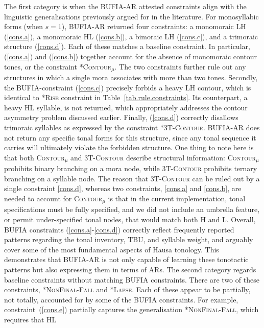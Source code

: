 The first category is when the BUFIA-AR attested constraints align
with the linguistic generalisations previously argued for in the
literature. For monosyllabic forms (when \(s=1\)), BUFIA-AR returned
four constraints: a monomoraic LH (\ref{cons.a}), a monomoraic HL
(\ref{cons.b}), a bimoraic LH (\ref{cons.c}), and a trimoraic
structure (\ref{cons.d}).  Each of these matches a baseline
constraint.  In particular, (\ref{cons.a}) and (\ref{cons.b}) together
account for the absence of monomoraic contour tones, or the constraint
\textsc{*Contour}$_\mu$. The two constraints further rule out any
structures in which a single mora associates with more than two
tones. Secondly, the BUFIA-constraint (\ref{cons.c}) precisely forbids 
a heavy LH contour, which is identical to \textsc{*Rise} constraint in
Table~\ref{tab.rule.constraints}. Its counterpart, a heavy HL
syllable, is not returned, which appropriately addresses the contour
asymmetry problem discussed earlier. Finally, (\ref{cons.d}) correctly
disallows trimoraic syllables as expressed by the constraint
\textsc{*3T-Contour}. BUFIA-AR does not return any specific tonal
forms for this structure, since any tonal sequence it carries will
ultimately violate the forbidden structure.
One thing to note here is that both \textsc{Contour}{$_\mu$} and
\textsc{3T-Contour} describe structural information:
\textsc{Contour}{$_\mu$} prohibits binary branching on a mora node,
while \textsc{3T-Contour} prohibits ternary branching on a syllable
node. The reason that \textsc{3T-Contour} can be ruled out by a single
constraint \ref{cons.d}, whereas two constraints, \ref{cons.a} and
\ref{cons.b}, are needed to account for \textsc{Contour}{$_\mu$} is
that in the current implementation, tonal specifications must be fully
specified, and we did not include an umbrella feature, or permit
under-specified tonal nodes, that would match both H and L.
Overall, BUFIA constraints (\ref{cons.a}-\ref{cons.d}) correctly
reflect frequently reported patterns regarding the tonal inventory,
TBU, and syllable weight, and arguably cover some of the most
fundamental aspects of Hausa tonology. This demonstrates that BUFIA-AR
is not only capable of learning these tonotactic patterns but also
expressing them in terms of ARs.
The second category regards baseline constraints without matching
BUFIA constraints. There are two of these constraints,
\textsc{*NonFinal-Fall} and \textsc{*Lapse}. Each of these appear to
be partially, not totally, accounted for by some of the BUFIA
constraints. For example, constraint~(\ref{cons.e}) partially captures
the generalisation \textsc{*NonFinal-Fall}, which requires that HL
